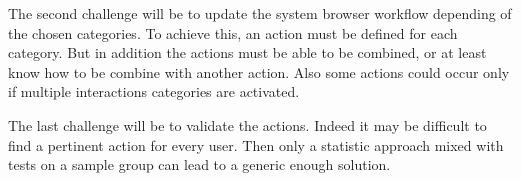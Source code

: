 \documentclass[12pt]{article}
\begin{document}
The second challenge will be to update the system browser workflow depending of the chosen categories.
To achieve this, an action must be defined for each category.
But in addition the actions must be able to be combined, or at least know how to be combine with another action.
Also some actions could occur only if multiple interactions categories are activated.

The last challenge will be to validate the actions.
Indeed it may be difficult to find a pertinent action for every user.
Then only a statistic approach mixed with tests on a sample group can lead to a generic enough solution.
\end{document}
